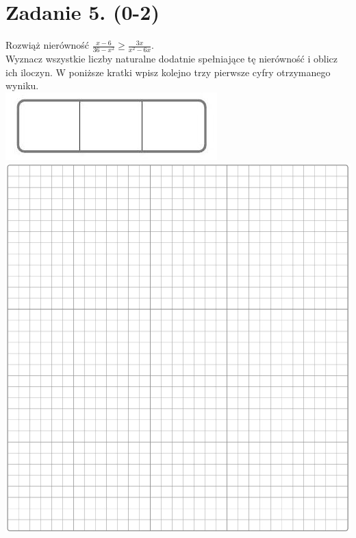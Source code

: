 \documentclass[10pt]{article}
\begin{document}
\section*{Zadanie 5. (0-2)}
Rozwiąż nierówność \(\frac{x-6}{36-x^{2}} \geq \frac{3 x}{x^{2}-6 x}\).\\
Wyznacz wszystkie liczby naturalne dodatnie spełniające tę nierówność i oblicz ich iloczyn. W poniższe kratki wpisz kolejno trzy pierwsze cyfry otrzymanego wyniku.\\
\includegraphics[max width=\textwidth, center]{2024_11_21_e30d1f37bf0e3631c088g-04}\\
\includegraphics[max width=\textwidth, center]{2024_11_21_e30d1f37bf0e3631c088g-04(1)}
\end{document}
